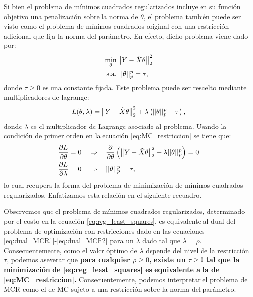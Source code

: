 Si bien el problema de mínimos cuadrados regularizados incluye en su función objetivo una penalización sobre la norma de $\theta$, el problema también puede ser visto como el problema de mínimos cuadrados original con una restricción adicional que fija la norma del parámetro. En efecto, dicho problema viene dado por:
\begin{align}
	\min_\theta & \left\lVert Y-\tilde{X}\theta\right\rVert_2^2\label{eq:dual_MCR1}\\
	\text{s.a.} &\ ||\theta||_p^p = \tau,\label{eq:dual_MCR2}
\end{align}
donde $\tau\geq0$ es una constante fijada. Este problema puede ser resuelto mediante multiplicadores de lagrange:
\begin{equation}
	L(\theta,\lambda) = \left\lVert Y-\tilde{X}\theta\right\rVert_2^2 + \lambda \left(||\theta||_p^p - \tau\right),
	\label{eq:MC_restriccion}
\end{equation}
donde $\lambda$ es el multiplicador de Lagrange asociado al problema. Usando la condición de primer orden en la ecuación \eqref{eq:MC_restriccion} se tiene que: 
\begin{align}
	\frac{\partial L}{\partial \theta} = 0 &\quad\Rightarrow\quad  \frac{\partial }{\partial \theta}\left(\left\lVert Y-\tilde{X}\theta\right\rVert_2^2 + \lambda ||\theta||_p^p \right) = 0\\
	\frac{\partial L}{\partial \lambda} = 0 &\quad\Rightarrow\quad ||\theta||_p^p = \tau,
\end{align}
lo cual recupera la forma del problema de minimización de mínimos cuadrados regularizados. Enfatizamos esta relación en el siguiente recuadro. 

\begin{mdframed}[style=discusion, frametitle={\center Mínimos cuadrados regularizados: optimización con restricciones}]
Observemos que el problema de mínimos cuadrados regularizados, determinado por el costo en la ecuación \eqref{eq:reg_least_squares}, es equivalente al dual del problema de optimización con restricciones dado en las ecuaciones \eqref{eq:dual_MCR1}-\eqref{eq:dual_MCR2} para un $\lambda$ dado tal que $\lambda =\rho$. Consecuentemente, como el valor óptimo de $\lambda$ depende del nivel de la restricción $\tau$, podemos aseverar que \textbf{para cualquier $\rho\geq0$, existe un $\tau\geq0$ tal que la minimización de \eqref{eq:reg_least_squares} es equivalente a la de \eqref{eq:MC_restriccion}.} Consecuentemente,  podemos interpretar el problema de MCR como el de MC sujeto a una restricción sobre la norma del parámetro. 
	
\end{mdframed}

